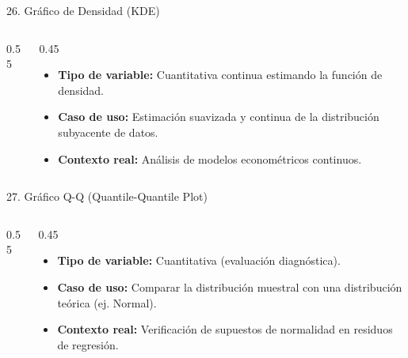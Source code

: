 \documentclass[aspectratio=169,10pt]{beamer}
\begin{document}
\begin{frame}{26. Gráfico de Densidad (KDE)}
\begin{columns}
\begin{column}{0.55\textwidth}
\end{column}
\begin{column}{0.45\textwidth}
\begin{itemize}\small
\item \textbf{Tipo de variable:} Cuantitativa continua estimando la función de densidad.
\item \textbf{Caso de uso:} Estimación suavizada y continua de la distribución subyacente de datos.
\item \textbf{Contexto real:} Análisis de modelos econométricos continuos.
\end{itemize}
\end{column}
\end{columns}
\end{frame}

\begin{frame}{27. Gráfico Q-Q (Quantile-Quantile Plot)}
\begin{columns}
\begin{column}{0.55\textwidth}
\end{column}
\begin{column}{0.45\textwidth}
\begin{itemize}\small
\item \textbf{Tipo de variable:} Cuantitativa (evaluación diagnóstica).
\item \textbf{Caso de uso:} Comparar la distribución muestral con una distribución teórica (ej. Normal).
\item \textbf{Contexto real:} Verificación de supuestos de normalidad en residuos de regresión.
\end{itemize}
\end{column}
\end{columns}
\end{frame}
\end{document}

